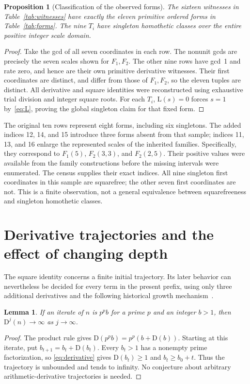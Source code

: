 \documentclass[11pt,a4paper]{article}
\newcommand{\D}{\mathrm{D}}
\newcommand{\Lrate}{\mathrm{L}}
\newtheorem{proposition}[theorem]{Proposition}
\newtheorem{lemma}[theorem]{Lemma}
\theoremstyle{definition}
\theoremstyle{remark}
\begin{document}
\begin{proposition}[Classification of the observed forms]\label{prop:observed}
The sixteen witnesses in Table~\ref{tab:witnesses} have exactly the eleven
primitive ordered forms in Table~\ref{tab:forms}. The nine $T_i$ have
singleton homothetic classes over the entire positive integer scale domain.
\end{proposition}
\begin{proof}
Take the gcd of all seven coordinates in each row. The nonunit gcds are
precisely the seven scales shown for $F_1,F_2$. The other nine rows have
gcd~1 and rate zero, and hence are their own primitive derivative witnesses.
Their first coordinates are distinct, and differ from those of $F_1,F_2$,
so the eleven tuples are distinct. All derivative and square identities
were reconstructed using exhaustive trial division and integer square roots.
For each $T_i$, $\Lrate(s)=0$ forces $s=1$ by~\eqref{eq:L}, proving the
global singleton claim for that fixed form.
\end{proof}

The original ten rows represent eight forms, including six singletons.
The added indices 12, 14, and 15 introduce three forms absent from that
sample; indices 11, 13, and 16 enlarge the represented scales of the
inherited families. Specifically, they correspond to $F_1(5)$,
$F_2(3,3)$, and $F_2(2,5)$. Their positive values were available from
the family constructions before the missing intervals were enumerated.
The census supplies their exact indices. All nine singleton first
coordinates in this sample are squarefree; the other seven first
coordinates are not. This is a finite observation, not a general equivalence
between squarefreeness and singleton homothetic classes.

\section{Derivative trajectories and the effect of changing depth}\label{sec:dynamics}

The square identity concerns a finite initial trajectory. Its later behavior
can nevertheless be decided for every term in the present prefix, using
only three additional derivatives and the following historical growth
mechanism~\cite[Theorem 4]{ufnarovski}.

\begin{lemma}\label{lem:growth}
If an iterate of $n$ is $p^pb$ for a prime $p$ and an integer $b>1$,
then $\D^j(n)\longrightarrow\infty$ as $j\longrightarrow\infty$.
\end{lemma}
\begin{proof}
The product rule gives $\D(p^pb)=p^p(b+\D(b))$.
Starting at this iterate, put $b_{t+1}=b_t+\D(b_t)$.
Every $b_t>1$ has a nonempty prime factorization, so
\eqref{eq:derivative} gives $\D(b_t)\ge1$ and $b_t\ge b_0+t$.
Thus the trajectory is unbounded and tends to infinity. No conjecture
about arbitrary arithmetic-derivative trajectories is needed.
\end{proof}
\end{document}

